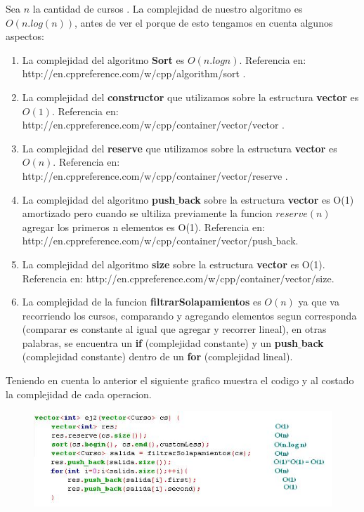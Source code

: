 \begin{itemize}
Sea $n$ la cantidad de cursos . La complejidad de nuestro algoritmo es $O(n.log (n))$, antes de ver el porque de esto tengamos en cuenta algunos aspectos:
\begin{enumerate}
\item La complejidad del algoritmo \textbf{Sort} es $O(n.log n)$. Referencia en:  \\
       http://en.cppreference.com/w/cpp/algorithm/sort .
\item La complejidad del \textbf{constructor} que utilizamos sobre la estructura \textbf{vector} es $O(1)$. Referencia en: http://en.cppreference.com/w/cpp/container/vector/vector .
\item La complejidad del \textbf{reserve} que utilizamos sobre la estructura \textbf{vector} es $O(n)$. Referencia en: http://en.cppreference.com/w/cpp/container/vector/reserve .
\item La complejidad del algoritmo \textbf{push$\_$back} sobre la estructura \textbf{vector} es O(1) amortizado pero cuando se ultiliza previamente la funcion $reserve(n)$ agregar los primeros n elementos es O(1). Referencia en: http://en.cppreference.com/w/cpp/container/vector/push$\_$back. 
\item La complejidad del algoritmo \textbf{size} sobre la estructura \textbf{vector} es O(1). Referencia en: http://en.cppreference.com/w/cpp/container/vector/size.
\item La complejidad de la funcion \textbf{filtrarSolapamientos} es $O(n)$ ya que va recorriendo los cursos, comparando y agregando elementos segun corresponda (comparar es constante al igual que agregar y recorrer lineal), en otras palabras, se encuentra un \textbf{if} (complejidad constante) y un \textbf{push$\_$back} (complejidad constante) dentro de un \textbf{for} (complejidad lineal). 
\end{enumerate}
Teniendo en cuenta lo anterior el siguiente grafico muestra el codigo y al costado la complejidad de cada operacion.

\begin{figure}[H] %
\begin{center}
\includegraphics[]{../imgs/comple2.jpg}
\end{center}
\end{figure}


\end{itemize}
